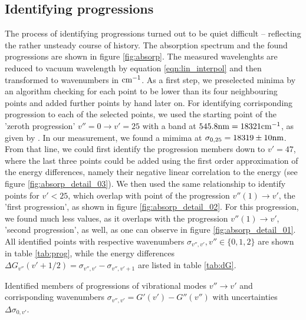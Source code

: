 \subsection{Identifying progressions}
The process of identifying progressions turned out to be quiet difficult – reflecting the 
rather unsteady course of history. 
The absorption spectrum and the found progressions are shown in figure \ref{fig:absorp}.
The measured wavelenghts are reduced to vacuum wavelength by equation \eqref{eqn:lin_interpol} 
and then transformed to wavenumbers in $\mathrm{cm^{-1}}$. 
As a first step, we preselected minima by an algorithm checking for each point to be lower than 
its four neighbouring points and added further points by hand later on. For identifying corrisponding 
progression to each of the selected points, we used the starting point of the 'zeroth progression' 
$v'' = 0  \rightarrow v' = 25$ with a band at $545.8 \mathrm{nm} = 18321 \mathrm{cm^{-1}}$, as given by \cite{}. In our 
measurement, we found a mimima at $\sigma_{0, 25} = 18319 \pm 10\mathrm{nm}$. From that line, we could first 
identify the progression members down to $v' = 47$, where the last three points could be added using 
the first order approximation of the energy differences, namely their negative linear correlation 
to the energy (see figure \ref{fig:absorp_detail_03}). We then used the same relationship to identify 
points for $v' < 25$, which overlap with point of the progression $v''(1) \rightarrow v'$, the 
'first progression', 
as shown in figure \ref{fig:absorp_detail_02}. For this progression, we found much less values, as 
it overlaps with the progression $v''(1) \rightarrow v'$, 'second progression', as well, as one can 
observe in figure \ref{fig:absorp_detail_01}. All identified points with respective wavenumbers 
$\sigma_{v'', v'}, v'' \in \{0, 1, 2\}$ are shown in table \ref{tab:prog}, 
while the energy differences $\Delta G_{v''}(v' + 1 / 2) = \sigma_{v'', v'} - \sigma_{v'', v' + 1}$ are 
listed in table \ref{tab:dG}.

\begin{table}[h]
\centering
\small

\caption{Identified members of progressions of vibrational modes $v'' \rightarrow v'$ 
and corrisponding wavenumbers $\sigma_{v'', v'} = G'(v') - G''(v'')$ with uncertainties
$\Delta \sigma_{0, v'}$. }
\label{tab:prog}
\end{table}

